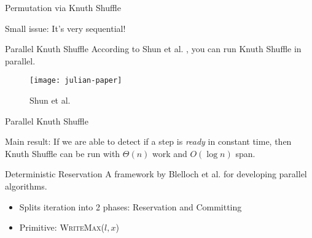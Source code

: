 \begin{frame}{Permutation via Knuth Shuffle}
  \begin{center}
    \Large{Small issue: It's very sequential!}
  \end{center}
\end{frame}

\begin{frame}{Parallel Knuth Shuffle}
  According to Shun et al. \cite{julian-parperm}, you can run Knuth Shuffle in
  parallel.

  \begin{figure}
    \begin{center}
      \texttt{[image: julian-paper]}
    \end{center}
    \caption{Shun et al. \cite{julian-parperm}}
  \end{figure}
\end{frame}

\begin{frame}{Parallel Knuth Shuffle}
  \begin{center}
    \Large{Main result: If we are able to detect if a step is
      \textit{ready} in constant time, then Knuth Shuffle can be
      run with \(\Theta(n)\) work and \(O(\log n)\) span.}
  \end{center}
\end{frame}

\begin{frame}{Deterministic Reservation}
  A framework by Blelloch et al. \cite{blelloch-detreserve} for developing
  parallel algorithms.
  \begin{itemize}
    \item Splits iteration into 2 phases: Reservation and Committing
    \item Primitive: \textsc{WriteMax(\(l, x\))} 
  \end{itemize}
\end{frame}
